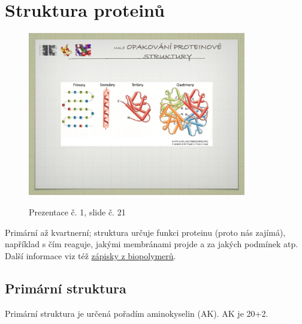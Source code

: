 \documentclass[DIV=8]{scrreprt}
\begin{document}
\chapter{Struktura proteinů} \label{Struktura proteinů}


\begin{figure}
    \caption{Prezentace č. 1, slide č. 21}
    \includegraphics[width=0.85\textwidth]{slides-1/slide-21.jpg}
    \centering
    \label{slides-1-slide-21}
\end{figure}

Primární až kvartnerní; struktura určuje funkci proteinu (proto nás zajímá), například s čím reaguje, jakými membránami projde a za jakých podmínek atp. Další informace viz též \href{/doc/biopolymery/notes.html\#Stavba proteinů}{zápisky z biopolymerů}.

\section{Primární struktura} \label{Primární struktura} \FloatBarrier


Primární struktura je určená pořadím aminokyselin (AK). AK je 20+2.
\end{document}
